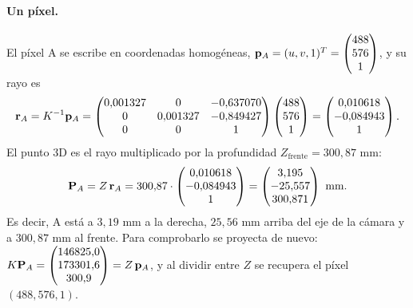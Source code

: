 \paragraph{Un píxel.} El píxel A se escribe en coordenadas homogéneas, $\mathbf{p}_A=(u,v,1)^T=\begin{pmatrix} 488 \\ 576 \\ 1 \end{pmatrix}$, y su rayo es
\begin{equation}
\mathbf{r}_A=K^{-1}\mathbf{p}_A=\begin{pmatrix} 0{,}001327 & 0 & -0{,}637070 \\ 0 & 0{,}001327 & -0{,}849427 \\ 0 & 0 & 1 \end{pmatrix}\begin{pmatrix} 488 \\ 576 \\ 1 \end{pmatrix}=\begin{pmatrix} 0{,}010618 \\ -0{,}084943 \\ 1 \end{pmatrix} .
\end{equation}
El punto 3D es el rayo multiplicado por la profundidad $Z_{\text{frente}}=300{,}87$ mm:
\begin{equation}
\mathbf{P}_A=Z\,\mathbf{r}_A=300{,}87\cdot\begin{pmatrix} 0{,}010618 \\ -0{,}084943 \\ 1 \end{pmatrix}=\begin{pmatrix} 3{,}195 \\ -25{,}557 \\ 300{,}871 \end{pmatrix}\ \text{mm}.
\end{equation}
Es decir, A está a $3{,}19$ mm a la derecha, $25{,}56$ mm arriba del eje de la cámara y a $300{,}87$ mm al frente.
Para comprobarlo se proyecta de nuevo: $K\mathbf{P}_A=\begin{pmatrix} 146825{,}0 \\ 173301{,}6 \\ 300{,}9 \end{pmatrix}=Z\,\mathbf{p}_A$, y al dividir entre $Z$ se recupera el píxel $(488,576,1)$.


